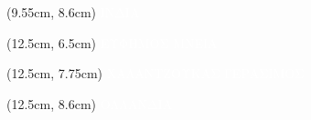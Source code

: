 \documentclass[aspectratio=3219]{beamer}
\begin{document}
{\begin{frame}
\begin{textblock*}{2.95cm}(9.55cm, 8.6cm)
    \centering
    \textcolor{white}{\tiny ΙΝΔΙΑ \\}
\end{textblock*}

\begin{textblock*}{2.95cm}(12.5cm, 6.5cm)
    \centering
    \textcolor{white}{\scriptsize ΕΥΦΗΜΟΣ ΜΝΕΙΑ \\}
\end{textblock*}

\begin{textblock*}{2.95cm}(12.5cm, 7.75cm)
    \centering
    \textcolor{white}{\scriptsize ΧΑΛΑΝΤΖΟΥΚΑΣ ΓΕΡΑΣΙΜΟΣ \\}
\end{textblock*}

\begin{textblock*}{2.95cm}(12.5cm, 8.6cm)
    \centering
    \textcolor{white}{\tiny ΟΛΛΑΝΔΙΑ \\}
\end{textblock*}

\end{frame}
}
\end{document}
